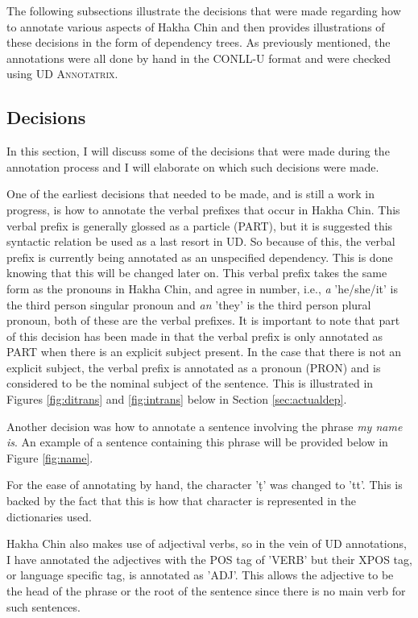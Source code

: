 \documentclass[10pt, a4paper]{article}
\begin{document}
The following subsections illustrate the decisions that were made regarding how to annotate various aspects of Hakha Chin and then provides illustrations of these decisions in the form of dependency trees. As previously mentioned, the annotations were all done by hand in the CONLL-U format and were checked using UD \textsc{Annotatrix}.

\subsection{Decisions}
\label{sec:dec}
In this section, I will discuss some of the decisions that were made during the annotation process and I will elaborate on which such decisions were made. 

One of the earliest decisions that needed to be made, and is still a work in progress, is how to annotate the verbal prefixes that occur in Hakha Chin. This verbal prefix is generally glossed as a particle (PART), but it is suggested this syntactic relation be used as a last resort in UD. So because of this, the verbal prefix is currently being annotated as an unspecified dependency. This is done knowing that this will be changed later on. This verbal prefix takes the same form as the pronouns in Hakha Chin, and agree in number, i.e., \emph{a} 'he/she/it' is the third person singular pronoun and \emph{an} 'they' is the third person plural pronoun, both of these are the verbal prefixes. It is important to note that part of this decision has been made in that the verbal prefix is only annotated as PART when there is an explicit subject present. In the case that there is not an explicit subject, the verbal prefix is annotated as a pronoun (PRON) and is considered to be the nominal subject of the sentence. This is illustrated in Figures \ref{fig:ditrans} and \ref{fig:intrans} below in Section \ref{sec:actualdep}.

Another decision was how to annotate a sentence involving the phrase \textit{my name is}. An example of a sentence containing this phrase will be provided below in Figure \ref{fig:name}. 

For the ease of annotating by hand, the character '\d{t}' was changed to 'tt'. This is backed by the fact that this is how that character is represented in the dictionaries used.

Hakha Chin also makes use of adjectival verbs, so in the vein of UD annotations, I have annotated the adjectives with the POS tag of 'VERB' but their XPOS tag, or language specific tag, is annotated as 'ADJ'. This allows the adjective to be the head of the phrase or the root of the sentence since there is no main verb for such sentences.
\end{document}

